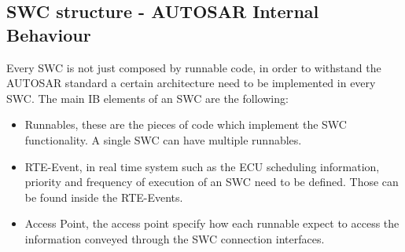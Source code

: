 \documentclass[../main.tex]{subfiles}
\begin{document}
\subsection{SWC structure - AUTOSAR Internal Behaviour}
Every \gls{SWC} is not just composed by runnable code, in order to withstand the \gls{AUTOSAR} standard a certain architecture need to be implemented in every \gls{SWC}. The main \gls{IB} elements of an SWC are the following:
\begin{itemize}
    \item Runnables, these are the pieces of code which implement the \gls{SWC} functionality. A single \gls{SWC} can have multiple runnables. 
    \item RTE-Event, in real time system such as the \gls{ECU} scheduling information, priority and frequency of execution of an \gls{SWC} need to be defined. Those can be found inside the RTE-Events. 
    \item Access Point, the access point specify how each runnable expect to access the information conveyed through the \gls{SWC} connection interfaces. 
\end{itemize}
\end{document}

